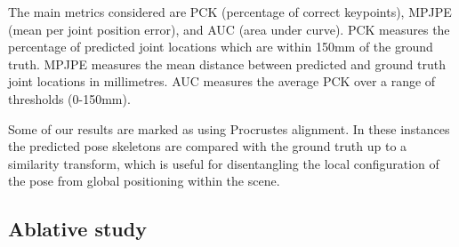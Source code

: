 \documentclass[australian,10pt,twocolumn,letterpaper,twocolumn]{article}
\begin{document}
The main metrics considered are PCK (percentage of correct keypoints),
MPJPE (mean per joint position error), and AUC (area under curve).
PCK measures the percentage of predicted joint locations which are
within 150mm of the ground truth. MPJPE measures the mean 
distance between predicted and ground truth joint locations in millimetres.
AUC measures the average PCK over a range of thresholds (0-150mm).

Some of our results are marked as using Procrustes alignment. In these
instances the predicted pose skeletons are compared with the ground
truth up to a similarity transform, which is useful for disentangling
the local configuration of the pose from global positioning within
the scene.

\subsection{Ablative study}
\end{document}
